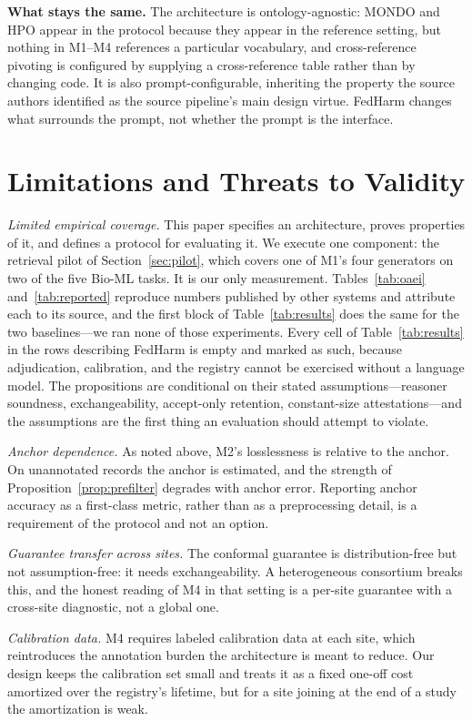 \documentclass[conference]{IEEEtran}
\begin{document}
\textbf{What stays the same.} The architecture is ontology-agnostic: MONDO and HPO appear in the protocol because they appear in the reference setting, but nothing in M1--M4 references a particular vocabulary, and cross-reference pivoting is configured by supplying a cross-reference table rather than by changing code. It is also prompt-configurable, inheriting the property the source authors identified as the source pipeline's main design virtue. FedHarm changes what surrounds the prompt, not whether the prompt is the interface.

\section{Limitations and Threats to Validity}

\textit{Limited empirical coverage.} This paper specifies an architecture, proves properties of it, and defines a protocol for evaluating it. We execute one component: the retrieval pilot of Section~\ref{sec:pilot}, which covers one of M1's four generators on two of the five Bio-ML tasks. It is our only measurement. Tables~\ref{tab:oaei} and~\ref{tab:reported} reproduce numbers published by other systems and attribute each to its source, and the first block of Table~\ref{tab:results} does the same for the two baselines---we ran none of those experiments. Every cell of Table~\ref{tab:results} in the rows describing FedHarm is empty and marked as such, because adjudication, calibration, and the registry cannot be exercised without a language model. The propositions are conditional on their stated assumptions---reasoner soundness, exchangeability, accept-only retention, constant-size attestations---and the assumptions are the first thing an evaluation should attempt to violate.

\textit{Anchor dependence.} As noted above, M2's losslessness is relative to the anchor. On unannotated records the anchor is estimated, and the strength of Proposition~\ref{prop:prefilter} degrades with anchor error. Reporting anchor accuracy as a first-class metric, rather than as a preprocessing detail, is a requirement of the protocol and not an option.

\textit{Guarantee transfer across sites.} The conformal guarantee is distribution-free but not assumption-free: it needs exchangeability. A heterogeneous consortium breaks this, and the honest reading of M4 in that setting is a per-site guarantee with a cross-site diagnostic, not a global one.

\textit{Calibration data.} M4 requires labeled calibration data at each site, which reintroduces the annotation burden the architecture is meant to reduce. Our design keeps the calibration set small and treats it as a fixed one-off cost amortized over the registry's lifetime, but for a site joining at the end of a study the amortization is weak.
\end{document}
